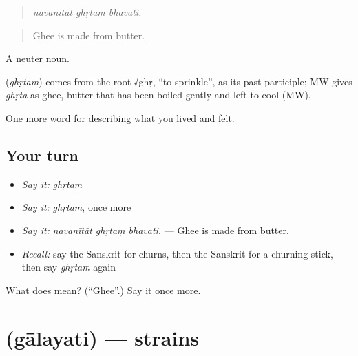 \begin{quote}
  
\end{quote}

\begin{quote}
\emph{navanītāt ghṛtaṃ bhavati.}
\end{quote}

\begin{quote}
Ghee is made from butter.
\end{quote}

A neuter noun.

\begin{cousinweb}
\textbf{} (\emph{ghṛtam}) comes from the root √ghṛ, \textquotedblleft{}to sprinkle\textquotedblright{}, as its past participle; MW gives \emph{ghṛta} as ghee, butter that has been boiled gently and left to cool (MW).
\end{cousinweb}

\begin{grammarlens}[title={What you've built}]
One more word for describing what you lived and felt.
\end{grammarlens}

\subsection*{Your turn}
\begin{itemize}
\raggedright
  \item \emph{Say it:} \emph{ghṛtam}
  \item \emph{Say it:} \emph{ghṛtam}, once more
  \item \emph{Say it:} \emph{navanītāt ghṛtaṃ bhavati.} — Ghee is made from butter.
  \item \emph{Recall:} say the Sanskrit for churns, then the Sanskrit for a churning stick, then say \emph{ghṛtam} again
\end{itemize}

\begin{tcolorbox}[breakable,colback=teal!4,colframe=teal!35!black,title={Before you move on}]
What does  mean? (\textquotedblleft{}Ghee\textquotedblright{}.) Say it once more.
\end{tcolorbox}
\section[\texorpdfstring{\sk{गालयति} (gālayati)}{गालयति (gālayati)}]{ (gālayati) — strains}

\label{lesson:SA-C513-galayati}



